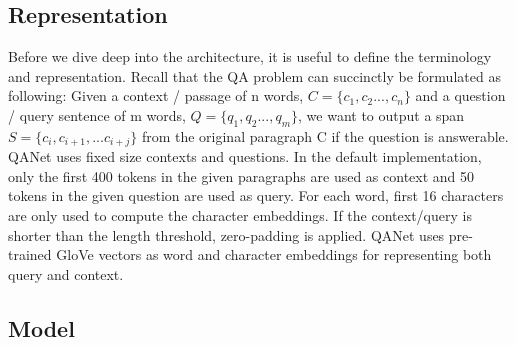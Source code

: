 \documentclass{article}
\begin{document}
\subsection{Representation}
\small
Before we dive deep into the architecture, it is useful to define the terminology and representation. Recall that the QA problem can succinctly be formulated as following: Given 
	a context / passage of n words, $C = \{c_1,c_2...,c_n\}$
	and a question / query sentence of m words, $Q = \{q_1,q_2...,q_m\}$,
we want to output a span $S=\{c_i,c_{{i+1}},...c_{{i+j}}\}$ from the original paragraph C if the question is answerable. QANet uses fixed size contexts and questions. In the default implementation, only the first 400 tokens in the given paragraphs are used as context and 50 tokens in the given question are used as  query. For each word, first 16 characters are only used to compute the character embeddings. If the context/query is shorter than the length threshold, zero-padding is applied. QANet uses pre-trained GloVe \cite{pennington2014glove} vectors as word and character embeddings for representing both query and context. 

\subsection{Model}
\small
\end{document}
